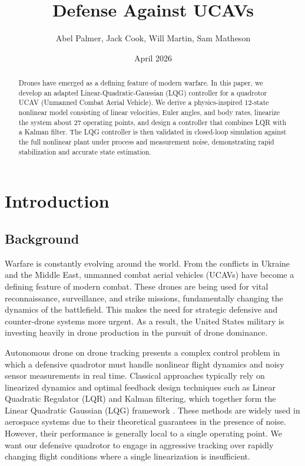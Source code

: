 \documentclass[11pt]{amsart}
\begin{document}
\title{Defense Against UCAVs}
\author{Abel Palmer, Jack Cook, Will Martin, Sam Matheson}

\date{April 2026} %

\maketitle %

\begin{abstract}
Drones have emerged as a defining feature of modern warfare. In this paper, we develop an adapted Linear-Quadratic-Gaussian (LQG) controller for a quadrotor UCAV (Unmanned Combat Aerial Vehicle). We derive a physics-inspired 12-state nonlinear model consisting of linear velocities, Euler angles, and body rates, linearize the system about 27 operating points, and design a controller that combines LQR with a Kalman filter. The LQG controller is then validated in closed-loop simulation against the full nonlinear plant under process and measurement noise, demonstrating rapid stabilization and accurate state estimation.
\end{abstract}

\section{\textbf{Introduction}}

\subsection{Background}
Warfare is constantly evolving around the world. From the conflicts in Ukraine and the Middle East, unmanned combat aerial vehicles (UCAVs) have become a defining feature of modern combat. These drones are being used for vital reconnaissance, surveillance, and strike missions, fundamentally changing the dynamics of the battlefield. This makes the need for strategic defensive and counter-drone systems more urgent. As a result, the United States military is investing heavily in drone production in the pursuit of drone dominance.

Autonomous drone on drone tracking presents a complex control problem in which a defensive quadrotor must handle nonlinear flight dynamics and noisy sensor measurements in real time. Classical approaches typically rely on linearized dynamics and optimal feedback design techniques such as Linear Quadratic Regulator (LQR) and Kalman filtering, which together form the Linear Quadratic Gaussian (LQG) framework \cite{astrom_murray}. These methods are widely used in aerospace systems due to their theoretical guarantees in the presence of noise. However, their performance is generally local to a single operating point. We want our defensive quadrotor to engage in aggressive tracking over rapidly changing flight conditions where a single linearization is insufficient.
\end{document}
